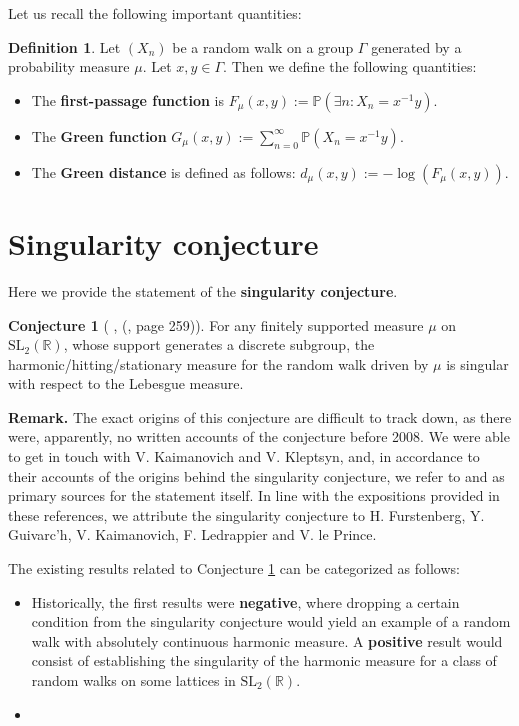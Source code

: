 \documentclass[11pt]{amsart}
\theoremstyle{definition}
\newtheorem{definition}{Definition}[section]
\newtheorem{conjecture}{Conjecture}[section]
\begin{document}
			Let us recall the following important quantities:
			\begin{definition}
				Let $(X_n)$ be a random walk on a group $\Gamma$ generated by a probability measure $\mu$. Let $x, y \in \Gamma$. Then we define the following quantities:
				\begin{itemize}
					\item The \textbf{first-passage function} is $F_\mu(x, y) := \mathbb{P}(\exists n : X_n = x^{-1} y)$.
					\item The \textbf{Green function} $G_\mu(x, y) := \sum_{n=0}^{\infty} \mathbb{P}(X_n = x^{-1} y)$.
					\item The \textbf{Green distance} is defined as follows: $d_\mu(x, y) := - \log(F_\mu(x, y))$.
				\end{itemize} 
			\end{definition}
			
	\section{Singularity conjecture}
	
	Here we provide the statement of the \textbf{singularity conjecture}.
	\begin{conjecture}[ \cite{MR2568439}, (\cite{kaimanovich2011matrix}, page 259)]
		\label{Fuchsian singularity conjecture}
		For any finitely supported measure $\mu$ on $\text{SL}_2(\mathbb{R})$, whose support generates a discrete subgroup, the harmonic/hitting/stationary measure for the random walk driven by $\mu$ is singular with respect to the Lebesgue measure.
	\end{conjecture}
	
	\textbf{Remark.} The exact origins of this conjecture are difficult to track down, as there were, apparently, no written accounts of the conjecture before 2008. We were able to get in touch with V. Kaimanovich and V. Kleptsyn, and, in accordance to their accounts of the origins behind the singularity conjecture, we refer to \cite{MR2568439} and \cite{kaimanovich2011matrix} as primary sources for the statement itself. In line with the expositions provided in these references, we attribute the singularity conjecture to H. Furstenberg, Y. Guivarc'h, V. Kaimanovich, F. Ledrappier and V. le Prince. 
	
	The existing results related to Conjecture \ref{Fuchsian singularity conjecture} can be categorized as follows:
	
	\begin{itemize}
		\item Historically, the first results were \textbf{negative}, where dropping a certain condition from the singularity conjecture would yield an example of a random walk with absolutely continuous harmonic measure. A \textbf{positive} result would consist of establishing the singularity of the harmonic measure for a class of random walks on some lattices in $\text{SL}_2(\mathbb{R})$.
		\item 
	\end{itemize}
	
\end{document}
